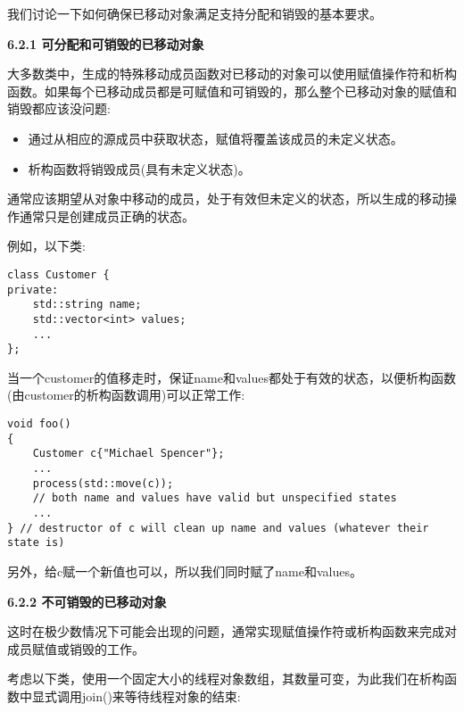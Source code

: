 我们讨论一下如何确保已移动对象满足支持分配和销毁的基本要求。\par

\hspace*{\fill} \par %
\textbf{6.2.1 可分配和可销毁的已移动对象}

大多数类中，生成的特殊移动成员函数对已移动的对象可以使用赋值操作符和析构函数。如果每个已移动成员都是可赋值和可销毁的，那么整个已移动对象的赋值和销毁都应该没问题:\par

\begin{itemize}
	\item 通过从相应的源成员中获取状态，赋值将覆盖该成员的未定义状态。
	\item 析构函数将销毁成员(具有未定义状态)。
\end{itemize}

通常应该期望从对象中移动的成员，处于有效但未定义的状态，所以生成的移动操作通常只是创建成员正确的状态。\par

例如，以下类:\par

\begin{lstlisting}[caption={}]
class Customer {
private:
	std::string name;
	std::vector<int> values;
	...
};
\end{lstlisting}

当一个customer的值移走时，保证name和values都处于有效的状态，以便析构函数(由customer的析构函数调用)可以正常工作:\par

\begin{lstlisting}[caption={}]
void foo()
{
	Customer c{"Michael Spencer"};
	...
	process(std::move(c));
	// both name and values have valid but unspecified states
	...
} // destructor of c will clean up name and values (whatever their state is)
\end{lstlisting}

另外，给c赋一个新值也可以，所以我们同时赋了name和values。\par

\hspace*{\fill} \par %
\textbf{6.2.2 不可销毁的已移动对象}

这时在极少数情况下可能会出现的问题，通常实现赋值操作符或析构函数来完成对成员赋值或销毁的工作。\par

考虑以下类，使用一个固定大小的线程对象数组，其数量可变，为此我们在析构函数中显式调用join()来等待线程对象的结束:\par

